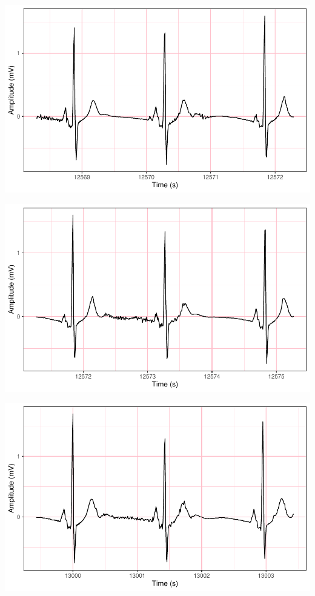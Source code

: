 \documentclass[
]{article}
\begin{document}
\begin{center}\includegraphics{report_files/figure-latex/abnormal-interval-12} \end{center}

\begin{center}\includegraphics{report_files/figure-latex/abnormal-interval-13} \end{center}

\begin{center}\includegraphics{report_files/figure-latex/abnormal-interval-14} \end{center}
\end{document}
